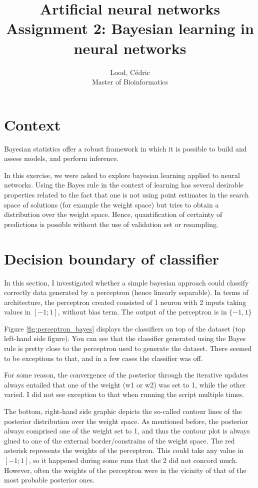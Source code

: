 \documentclass[11pt, a4paper]{article}
\title{ \huge Artificial neural networks \\ 
  { \large Assignment 2: Bayesian learning in neural networks }}
\author{
        Lood, Cédric \\
        \small Master of Bioinformatics
}
\begin{document}
\maketitle

\section{Context}
Bayesian statistics offer a robust framework in which it is possible
to build and assess models, and perform inference.

In this exercise, we were asked to explore bayesian learning applied
to neural networks. Using the Bayes rule in the context of learning
has several desirable properties related to the fact that one is not
using point estimates in the search space of solutions (for example
the weight space) but tries to obtain a distribution over the weight
space. Hence, quantification of certainty of predictions is possible
without the use of validation set or resampling.

\section{Decision boundary of classifier}

In this section, I investigated whether a simple bayesian approach
could classify correctly data generated by a perceptron (hence
linearly separable). In terms of architecture, the perceptron created
consisted of 1 neuron with 2 inputs taking values in $[-1; 1]$,
without bias term. The output of the perceptron is in $\{-1, 1\}$

Figure \ref{fig:perceptron_bayes} displays the classifiers on top of
the dataset (top left-hand side figure). You can see that the
classifier generated using the Bayes rule is pretty close to the
perceptron used to generate the dataset. There seemed to be exceptions
to that, and in a few cases the classifier was off. 

For some reason, the convergence of the posterior through the
iterative updates always entailed that one of the weight (w1 or w2)
was set to 1, while the other varied. I did not see exception to that
when running the script multiple times.

The bottom, right-hand side graphic depicts the so-called contour
lines of the posterior distribution over the weight space. As
mentioned before, the posterior always comprised one of the weight set
to 1, and thus the contour plot is always glued to one of the external
border/constrains of the weight space. The red asterisk represents the
weights of the perceptron. This could take any value in $[-1; 1]$, so
it happened during some runs that the 2 did not concord much. However,
often the weights of the perceptron were in the vicinity of that of
the most probable posterior ones.
\end{document}
